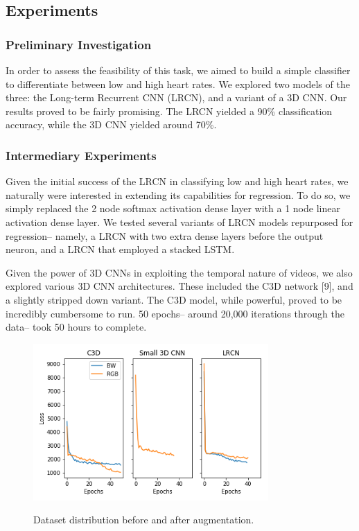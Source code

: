 \documentclass{article}
\begin{document}
\subsection[3.2] {Experiments}
\subsubsection[3.2.1]{Preliminary Investigation}
In order to assess the feasibility of this task, we aimed to build a simple classifier to differentiate between low and high heart rates. We explored two models of the three: the Long-term Recurrent CNN (LRCN), and a variant of a 3D CNN.
Our results proved to be fairly promising. The LRCN yielded a 90\% classification accuracy, while the 3D CNN yielded around 70\%.

\subsubsection[3.2.2]{Intermediary Experiments}
Given the initial success of the LRCN in classifying low and high heart rates, we naturally were interested in extending its capabilities for regression. To do so, we simply replaced the 2 node softmax activation dense layer with a 1 node linear activation dense layer. We tested several variants of LRCN models repurposed for regression-- namely, a LRCN with two extra dense layers before the output neuron, and a LRCN that employed a stacked LSTM.

Given the power of 3D CNNs in exploiting the temporal nature of videos, we also explored various 3D CNN architectures. These included the C3D network [9], and a slightly stripped down variant. The C3D model, while powerful, proved to be incredibly cumbersome to run. 50 epochs-- around 20,000 iterations through the data-- took 50 hours to complete.
\begin{center}
\begin{figure}[htb]
\includegraphics[width=0.8\textwidth]{figs/losses.png}
\label{fig:distrib}
\caption{Dataset distribution before and after augmentation.}
\end{figure}
\end{center}
\end{document}
